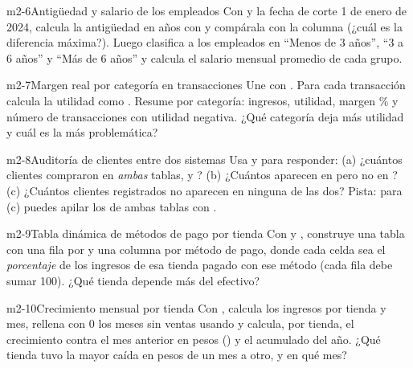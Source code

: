 \begin{ejercicio}{m2-6}{Antigüedad y salario de los empleados}
Con  y la fecha de corte 1 de enero de 2024, calcula
la antigüedad en años con  y
compárala con la columna  (¿cuál es la diferencia
máxima?). Luego clasifica a los empleados en ``Menos de 3 años'', ``3 a 6
años'' y ``Más de 6 años'' y calcula el salario mensual promedio de cada
grupo.
\end{ejercicio}

\begin{ejercicio}{m2-7}{Margen real por categoría en transacciones}
Une  con . Para cada
transacción calcula la utilidad como
. Resume por categoría:
ingresos, utilidad, margen \% y número de transacciones con utilidad
negativa. ¿Qué categoría deja más utilidad y cuál es la más problemática?
\end{ejercicio}

\begin{ejercicio}{m2-8}{Auditoría de clientes entre dos sistemas}
Usa  y  para responder: (a)
¿cuántos clientes compraron en \emph{ambas} tablas,  y
? (b) ¿Cuántos aparecen en  pero
no en ? (c) ¿Cuántos clientes registrados no aparecen en
ninguna de las dos? Pista: para (c) puedes apilar los 
de ambas tablas con .
\end{ejercicio}

\begin{ejercicio}{m2-9}{Tabla dinámica de métodos de pago por tienda}
Con  y , construye una tabla
con una fila por  y una columna por método de pago,
donde cada celda sea el \emph{porcentaje} de los ingresos de esa tienda
pagado con ese método (cada fila debe sumar 100). ¿Qué tienda depende más
del efectivo?
\end{ejercicio}

\begin{ejercicio}{m2-10}{Crecimiento mensual por tienda}
Con , calcula los ingresos por tienda y mes,
rellena con 0 los meses sin ventas usando  y calcula, por
tienda, el crecimiento contra el mes anterior en pesos () y el acumulado del año. ¿Qué tienda tuvo la mayor caída en
pesos de un mes a otro, y en qué mes?
\end{ejercicio}

